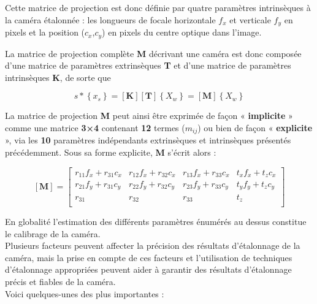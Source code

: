   Cette matrice de projection est donc définie par quatre paramètres intrinsèques à la caméra étalonnée : les longueurs de focale horizontale $f_x$ et verticale $f_y$ en pixels et la position ($c_x$,$c_y$) en pixels du centre optique dans l’image.
  
  La matrice de projection complète \textbf{M} décrivant une caméra est donc composée d’une matrice de paramètres extrinsèques \textbf{T} et d’une matrice de paramètres intrinsèques \textbf{K}, de sorte que
  
   \begin{equation}
  s
  *
  \left\{ x_s \right\}
  =
  \left[ \textbf{K} \right] 
  \left[ \textbf{T} \right]
  \left\{ X_w \right\} 
  =
  \left[ \textbf{M} \right]
  \left\{ X_w \right\} 
\end{equation}
  
  La matrice de projection \textbf{M} peut ainsi être exprimée de façon « \textbf{implicite} » comme une matrice \textbf{3×4} contenant \textbf{12} termes ($m_{ij}$) ou bien de façon « \textbf{explicite} », via les \textbf{10} paramètres indépendants extrinsèques et intrinsèques présentés précédemment. Sous sa forme explicite, \textbf{M} s’écrit alors :
  
   \begin{equation}
  \left[ \textbf{M} \right]
  =
  \left[ 
  \begin{array}{cccc}
  	r_{11}f_x + r_{31}c_x & r_{12}f_x + r_{32}c_x & r_{13}f_x + r_{33}c_x & t_xf_x + t_zc_x \\
  	r_{21}f_y + r_{31}c_y & r_{22}f_y + r_{32}c_y & r_{23}f_y + r_{33}c_y & t_yf_y + t_zc_y \\
  	r_{31} & r_{32} & r_{33} & t_z\\
  \end{array}
  \right]
\end{equation}
  
  En globalité l'estimation des différents paramètres énumérés au dessus constitue le calibrage de la caméra.\\
  
  
  Plusieurs facteurs peuvent affecter la précision des résultats d’étalonnage de la caméra, mais la prise en compte de ces facteurs et l’utilisation de techniques d’étalonnage appropriées peuvent aider à garantir des résultats d’étalonnage précis et fiables de la caméra. \\
  
  Voici quelques-unes des plus importantes : 
  
